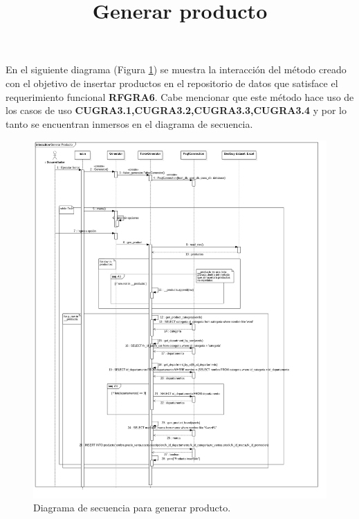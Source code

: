 \title{\textbf{Generar producto\\}}
En el siguiente diagrama (Figura \ref{image:DSGenerarProducto}) se muestra la interacción del método creado con el objetivo de insertar productos en el repositorio de datos que satisface el requerimiento funcional \textbf{RFGRA6}. Cabe mencionar que este método hace uso de los  casos de uso \textbf{CUGRA3.1,CUGRA3.2,CUGRA3.3,CUGRA3.4} y por lo tanto se encuentran inmersos en el diagrama de secuencia.  
\FloatBarrier
\begin{figure}[htbp!]
		\centering
			\includegraphics[width=1 \textwidth]{imagenes/DSRuben/gen_product_generator}
		\caption{Diagrama de secuencia para generar producto.}
		\label{image:DSGenerarProducto}
\end{figure}
\FloatBarrier




